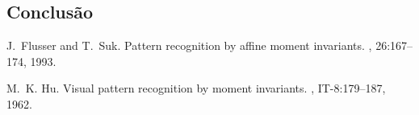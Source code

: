 \documentclass{sciposter}
\begin{document}
\begin{multicols}{2}
\lipsum[3-5]

\section{Conclusão}
\lipsum[1]


\begin{thebibliography}{1}
J.~Flusser and T.~Suk.
\newblock Pattern recognition by affine moment invariants.
, 26:167--174, 1993.

M.~K. Hu.
\newblock Visual pattern recognition by moment invariants.
, IT-8:179--187, 1962.
\end{thebibliography}

\end{multicols}
\end{document}
